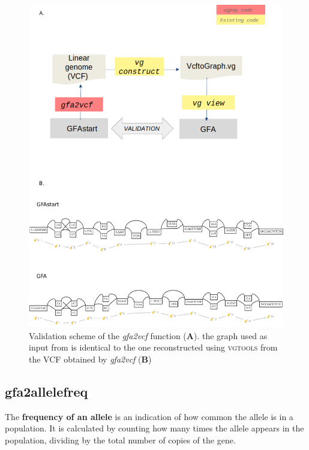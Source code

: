 \begin{figure}[H]
\centering
\includegraphics[width=1.00 \textwidth]{fig/validationgfa2.vcf.png}
\decoRule
\caption{Validation scheme of the \textit{gfa2vcf} function (\textbf{A}). the graph used as input from \vgp is identical to the one reconstructed using \textsc{vgtools} from the VCF obtained by \textit{gfa2vcf} (\textbf{B})}
\label{fig:validationgraph.png}
\end{figure}


\subsection{gfa2allelefreq} 

The \textbf{frequency of an allele} is an indication of how common the allele is in a population. It is calculated by counting how many times the allele appears in the population, dividing by the total number of copies of the gene.\\

